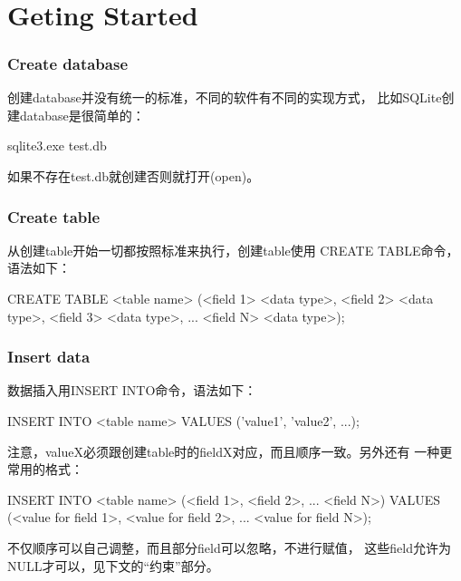 \documentclass[a4paper,11pt]{article}
\begin{document}
\tt %
\pagestyle{header}
\sybmaketitle
\tableofcontents
\newpage

\pagestyle{main}
\setcounter{page}{1}

\part[Geting Started]{Geting Started}
\section[Create database]{Create database}
创建database并没有统一的标准，不同的软件有不同的实现方式，
比如SQLite创建database是很简单的：

\begin{bashcode}
sqlite3.exe test.db
\end{bashcode}

如果不存在test.db就创建否则就打开(open)。

\section[Create table]{Create table}
从创建table开始一切都按照标准来执行，创建table使用
CREATE TABLE命令，语法如下：

\begin{sqlcode}
CREATE TABLE <table name>
(<field 1> <data type>,
 <field 2> <data type>,
 <field 3> <data type>,
 ...
 <field N> <data type>);
\end{sqlcode}

\section[Insert data]{Insert data}
数据插入用INSERT INTO命令，语法如下：

\begin{sqlcode}
INSERT INTO <table name>
VALUES ('value1', 'value2', ...);
\end{sqlcode}

注意，valueX必须跟创建table时的fieldX对应，而且顺序一致。另外还有
一种更常用的格式：

\begin{sqlcode}
INSERT INTO <table name>
(<field 1>,
 <field 2>,
 ...
 <field N>)
VALUES
(<value for field 1>,
 <value for field 2>,
 ...
 <value for field N>);
\end{sqlcode}

不仅顺序可以自己调整，而且部分field可以忽略，不进行赋值，
这些field允许为NULL才可以，见下文的“约束”部分。
\end{document}

